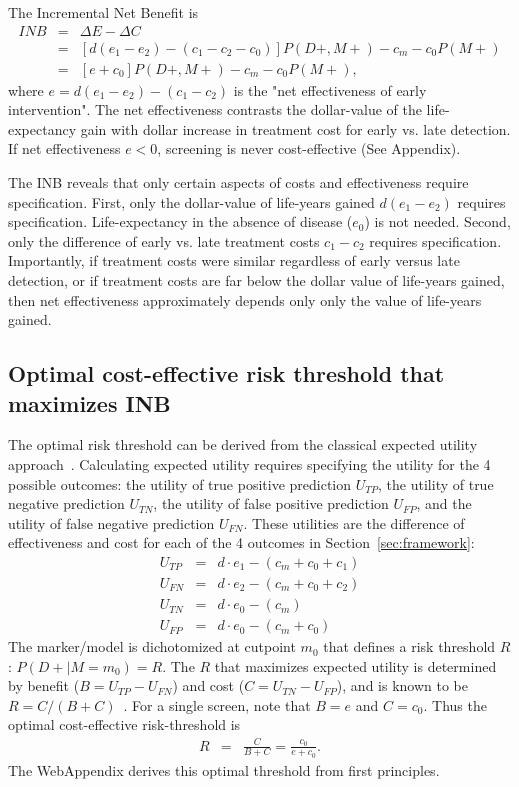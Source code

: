 \documentclass[11pt, letterpaper]{article}
\begin{document}
\noindent The Incremental Net Benefit is
\begin{eqnarray} 
INB &=& \Delta E - \Delta C\\ \nonumber
&=& [d(e_1-e_2)-(c_1-c_2-c_0)]P(D+,M+) - c_m - c_0P(M+)\\ \nonumber
&=& [e+c_0]P(D+,M+) - c_m - c_0P(M+), \label{eq:INB}
\end{eqnarray}
where $e = d(e_1-e_2)-(c_1-c_2)$ is the "net effectiveness of early intervention". The net effectiveness contrasts the dollar-value of the life-expectancy gain with dollar increase in treatment cost for early vs. late detection.  If net effectiveness $e<0$, screening is never cost-effective (See Appendix).  

The INB reveals that only certain aspects of costs and effectiveness require specification. First, only the dollar-value of life-years gained $d(e_1-e_2)$ requires specification.  Life-expectancy in the absence of disease ($e_0$) is not needed.  Second, only the difference of early vs. late treatment costs $c_1-c_2$ requires specification.  Importantly, if treatment costs were similar regardless of early versus late detection, or if treatment costs are far below the dollar value of life-years gained, then net effectiveness approximately depends only only the value of life-years gained.


\subsection{Optimal cost-effective risk threshold that maximizes INB}
\label{sec:optimalthreshold}

The optimal risk threshold can be derived from the classical expected utility approach~\citep{Pauker1980}.  Calculating expected utility requires specifying the utility for the 4 possible outcomes: the utility of true positive prediction $U_{TP}$, the utility of true negative prediction $U_{TN}$, the utility of false positive prediction $U_{FP}$, and the utility of false negative prediction $U_{FN}$.  These utilities are the difference of effectiveness and cost for each of the 4 outcomes in Section~\ref{sec:framework}:
\begin{eqnarray*}
	U_{TP} &=& d\cdot e_1 - (c_m+c_0+c_1) \\
	U_{FN} &=& d\cdot e_2 - (c_m+c_0+c_2)\\	
	U_{TN} &=& d\cdot e_0 - (c_m)\\
	U_{FP} &=& d\cdot e_0 - (c_m+c_0)
\end{eqnarray*}
The marker/model is dichotomized at cutpoint $m_0$ that defines a risk threshold $R$: $P(D+|M=m_0)=R$.  The $R$ that maximizes expected utility is determined by benefit ($B=U_{TP}-U_{FN}$) and cost ($C=U_{TN}-U_{FP}$), and is known to be $R=C/(B+C)$~\citep{Pauker1980}.  For a single screen, note that $B=e$ and $C=c_0$.  Thus the optimal cost-effective risk-threshold is
\begin{eqnarray}
R &=& \frac{C}{B+C} = \frac{c_0}{e+c_0}.
\end{eqnarray} 
The WebAppendix derives this optimal threshold from first principles.
\end{document}
